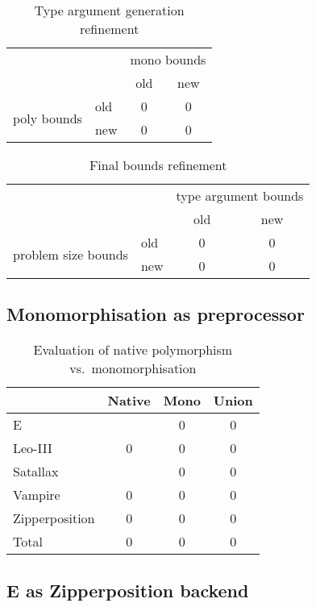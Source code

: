 \documentclass{article}
\begin{document}
\begin{table}[H]
\caption{Type argument generation refinement}
\centering\begin{tabular}{@{}llcc@{}}
   \toprule
   && \multicolumn{2}{c}{mono bounds} \\
   && old & new\\
   \cmidrule(r){3-4}
   \multirow{2}{5.4em}{poly bounds}
   &\multicolumn{1}{l|}{old} & 0  & 0 \\
   &\multicolumn{1}{l|}{new} & 0  & 0 \\
   \bottomrule
\end{tabular}
\end{table}


\begin{table}[H]
\caption{Final bounds refinement}
\centering\begin{tabular}{@{}llcc@{}}
   \toprule
   && \multicolumn{2}{c}{type argument bounds} \\
   && old & new\\
   \cmidrule(r){3-4}
   \multirow{2}{5.4em}{problem size bounds}
   &\multicolumn{1}{l|}{old} & 0  & 0 \\
   &\multicolumn{1}{l|}{new} & 0  & 0 \\
   \bottomrule
\end{tabular}
\end{table}

\subsection{Monomorphisation as preprocessor}

\begin{table}[ht]
\caption{Evaluation of native polymorphism vs.\ monomorphisation}
\centering\begin{tabular}{@{}lccc@{}}
   \toprule
   & Native & Mono & Union \\
   \midrule
   E  &   & 0 & 0 \\
   Leo-III & 0 & 0 & 0 \\
   Satallax &  & 0 & 0 \\
   Vampire & 0 & 0 & 0 \\
   Zipperposition & 0 & 0 & 0 \\[1.5\jot]
   Total & 0 & 0 & 0 \\
   \bottomrule
\end{tabular}
\end{table}

\subsection{E as Zipperposition backend}
\end{document}
